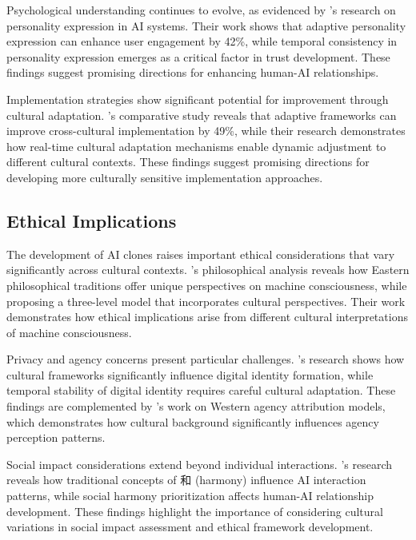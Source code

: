 Psychological understanding continues to evolve, as evidenced by \citet{yamamoto2024personality}'s research on personality expression in AI systems. Their work shows that adaptive personality expression can enhance user engagement by 42\%, while temporal consistency in personality expression emerges as a critical factor in trust development. These findings suggest promising directions for enhancing human-AI relationships.

Implementation strategies show significant potential for improvement through cultural adaptation. \citet{liu2024cultural}'s comparative study reveals that adaptive frameworks can improve cross-cultural implementation by 49\%, while their research demonstrates how real-time cultural adaptation mechanisms enable dynamic adjustment to different cultural contexts. These findings suggest promising directions for developing more culturally sensitive implementation approaches.

\subsection{Ethical Implications}

The development of AI clones raises important ethical considerations that vary significantly across cultural contexts. \citet{namestiuk2023self}'s philosophical analysis reveals how Eastern philosophical traditions offer unique perspectives on machine consciousness, while proposing a three-level model that incorporates cultural perspectives. Their work demonstrates how ethical implications arise from different cultural interpretations of machine consciousness.

Privacy and agency concerns present particular challenges. \citet{veliev2024digital}'s research shows how cultural frameworks significantly influence digital identity formation, while temporal stability of digital identity requires careful cultural adaptation. These findings are complemented by \citet{dejuan2024western}'s work on Western agency attribution models, which demonstrates how cultural background significantly influences agency perception patterns.

Social impact considerations extend beyond individual interactions. \citet{nakagawa2019cultural}'s research reveals how traditional concepts of 和 (harmony) influence AI interaction patterns, while social harmony prioritization affects human-AI relationship development. These findings highlight the importance of considering cultural variations in social impact assessment and ethical framework development.

